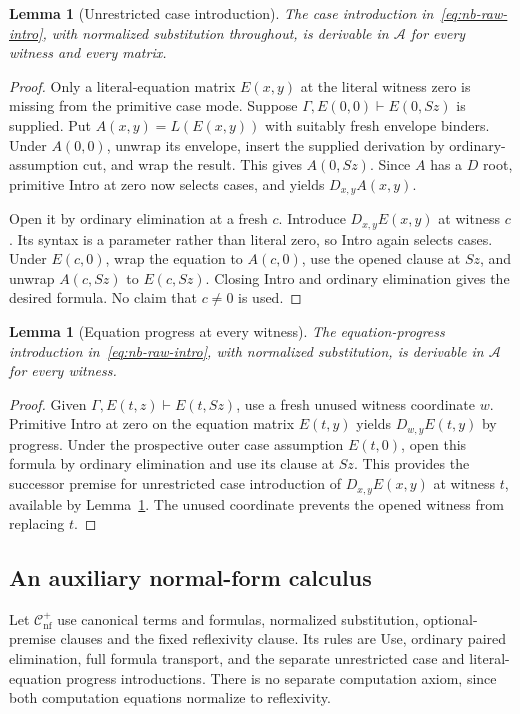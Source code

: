 \documentclass[11pt,a4paper]{article}
\newtheorem{lemma}[theorem]{Lemma}
\theoremstyle{definition}\newtheorem{definition}[theorem]{Definition}
\theoremstyle{remark}\newtheorem{remark}[theorem]{Remark}
\begin{document}
\begin{lemma}[Unrestricted case introduction]
\label{lem:nb-all-cases}
The case introduction in~\eqref{eq:nb-raw-intro}, with normalized
substitution throughout, is derivable in $\mathcal A$ for every witness
and every matrix.
\end{lemma}
\begin{proof}
Only a literal-equation matrix $E(x,y)$ at the literal witness zero
is missing from the primitive case mode. Suppose
$\Gamma,E(0,0)\vdash E(0,Sz)$ is supplied. Put
$A(x,y)=L(E(x,y))$ with suitably fresh envelope binders. Under
$A(0,0)$, unwrap its envelope, insert the supplied derivation by
ordinary-assumption cut, and wrap the result. This gives $A(0,Sz)$.
Since $A$ has a $D$ root, primitive Intro at zero now selects cases,
and yields $D_{x,y}A(x,y)$.

Open it by ordinary elimination at a fresh $c$. Introduce
$D_{x,y}E(x,y)$ at witness $c$. Its syntax is a parameter rather than
literal zero, so Intro again selects cases. Under $E(c,0)$, wrap the
equation to $A(c,0)$, use the opened clause at $Sz$, and unwrap
$A(c,Sz)$ to $E(c,Sz)$. Closing Intro and ordinary elimination gives
the desired formula. No claim that $c\ne0$ is used.
\end{proof}

\begin{lemma}[Equation progress at every witness]
\label{lem:nb-all-progress}
The equation-progress introduction in~\eqref{eq:nb-raw-intro}, with
normalized substitution, is derivable in $\mathcal A$ for every witness.
\end{lemma}
\begin{proof}
Given $\Gamma,E(t,z)\vdash E(t,Sz)$, use a fresh unused witness
coordinate $w$. Primitive Intro at zero on the equation matrix
$E(t,y)$ yields $D_{w,y}E(t,y)$ by progress. Under the prospective
outer case assumption $E(t,0)$, open this formula by ordinary
elimination and use its clause at $Sz$. This provides the successor
premise for unrestricted case introduction of $D_{x,y}E(x,y)$
at witness $t$, available by Lemma~\ref{lem:nb-all-cases}.
The unused coordinate prevents the opened witness from replacing $t$.
\end{proof}

\subsection{An auxiliary normal-form calculus}

Let $\mathcal C_{\mathrm{nf}}^+$ use canonical terms and formulas,
normalized substitution, optional-premise clauses and the fixed
reflexivity clause. Its rules are Use, ordinary paired elimination,
full formula transport, and the separate unrestricted case and
literal-equation progress introductions. There is no separate
computation axiom, since both computation equations normalize to
reflexivity.
\end{document}
